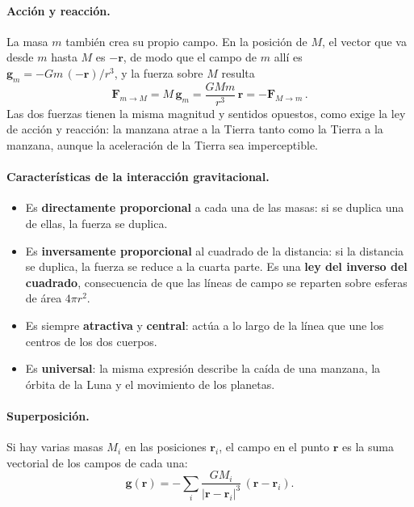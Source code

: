 \documentclass[11pt,a4paper]{book}
\begin{document}
\paragraph{Acción y reacción.}
La masa $m$ también crea su propio campo. En la posición de $M$, el vector
que va desde $m$ hasta $M$ es $-\boldsymbol{r}$, de modo que el campo de $m$
allí es $\boldsymbol{g}_m = -G m\,(-\boldsymbol{r})/r^{3}$, y la fuerza
sobre $M$ resulta
\begin{equation}
  \boldsymbol{F}_{m \to M} = M\,\boldsymbol{g}_m
  = \frac{G M m}{r^{3}}\,\boldsymbol{r}
  = -\boldsymbol{F}_{M \to m} \,.
  \label{eq:gravitacion_accion_reaccion}
\end{equation}
Las dos fuerzas tienen la misma magnitud y sentidos opuestos, como exige la
ley de acción y reacción: la manzana atrae a la Tierra tanto como la Tierra a
la manzana, aunque la aceleración de la Tierra sea imperceptible.

\paragraph{Características de la interacción gravitacional.}
\begin{itemize}
  \item Es \textbf{directamente proporcional} a cada una de las masas: si se
    duplica una de ellas, la fuerza se duplica.
  \item Es \textbf{inversamente proporcional} al cuadrado de la distancia: si
    la distancia se duplica, la fuerza se reduce a la cuarta parte. Es una
    \textbf{ley del inverso del cuadrado}, consecuencia de que las líneas de
    campo se reparten sobre esferas de área $4\pi r^{2}$.
  \item Es siempre \textbf{atractiva} y \textbf{central}: actúa a lo largo de
    la línea que une los centros de los dos cuerpos.
  \item Es \textbf{universal}: la misma expresión describe la caída de una
    manzana, la órbita de la Luna y el movimiento de los planetas.
\end{itemize}

\paragraph{Superposición.}
Si hay varias masas $M_i$ en las posiciones $\boldsymbol{r}_i$, el campo en
el punto $\boldsymbol{r}$ es la suma vectorial de los campos de cada una:
\begin{equation}
  \boldsymbol{g}(\boldsymbol{r})
  = -\sum_{i} \frac{G M_i}{\lvert \boldsymbol{r} - \boldsymbol{r}_i \rvert^{3}}
    \,(\boldsymbol{r} - \boldsymbol{r}_i) .
  \label{eq:campo_superposicion}
\end{equation}
\end{document}
